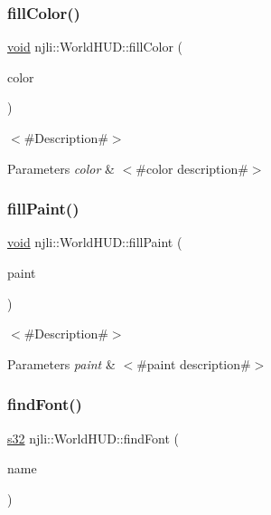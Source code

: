 \subsubsection{\texorpdfstring{fill\+Color()}{fillColor()}}
{\footnotesize\ttfamily \mbox{\hyperlink{_thread_8h_af1e856da2e658414cb2456cb6f7ebc66}{void}} njli\+::\+World\+H\+U\+D\+::fill\+Color (\begin{DoxyParamCaption}\item[{const bt\+Vector4 \&}]{color }\end{DoxyParamCaption})}

$<$\#\+Description\#$>$


\begin{DoxyParams}{Parameters}
{\em color} & $<$\#color description\#$>$ \\
\hline
\end{DoxyParams}
\mbox{\label{classnjli_1_1_world_h_u_d_aff3e8d583cecd7baaea183fe160b9853}} 
\subsubsection{\texorpdfstring{fill\+Paint()}{fillPaint()}}
{\footnotesize\ttfamily \mbox{\hyperlink{_thread_8h_af1e856da2e658414cb2456cb6f7ebc66}{void}} njli\+::\+World\+H\+U\+D\+::fill\+Paint (\begin{DoxyParamCaption}\item[{\mbox{\hyperlink{structnjli_1_1_j_l_i_paint}{J\+L\+I\+Paint}}}]{paint }\end{DoxyParamCaption})}

$<$\#\+Description\#$>$


\begin{DoxyParams}{Parameters}
{\em paint} & $<$\#paint description\#$>$ \\
\hline
\end{DoxyParams}
\mbox{\label{classnjli_1_1_world_h_u_d_a5e016ba34d85a2bbdba535129d4fdc6a}} 
\subsubsection{\texorpdfstring{find\+Font()}{findFont()}}
{\footnotesize\ttfamily \mbox{\hyperlink{_util_8h_aa62c75d314a0d1f37f79c4b73b2292e2}{s32}} njli\+::\+World\+H\+U\+D\+::find\+Font (\begin{DoxyParamCaption}\item[{const \mbox{\hyperlink{_util_8h_a2ff401e087cf786c38a6812723e94473}{s8}} $\ast$}]{name }\end{DoxyParamCaption})}

